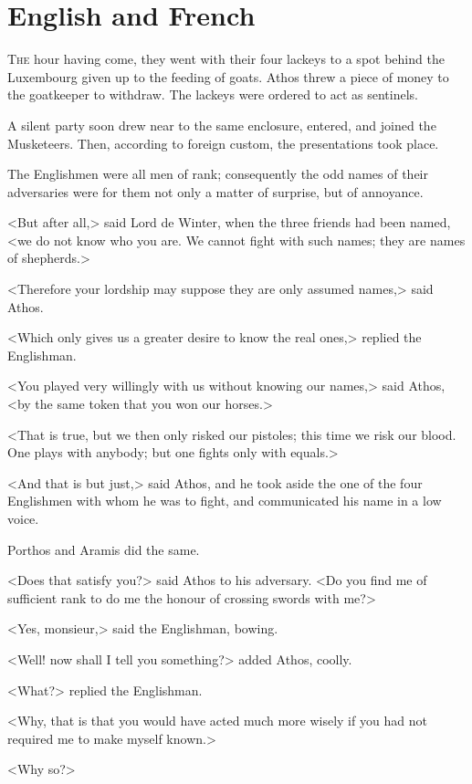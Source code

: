 
\chapter{English and French}

\lettrine{T}{he} hour having come, they went with their four lackeys to a spot behind the Luxembourg given up to the feeding of goats. Athos threw a piece of money to the goatkeeper to withdraw. The lackeys were ordered to act as sentinels. 

\zz
A silent party soon drew near to the same enclosure, entered, and joined the Musketeers. Then, according to foreign custom, the presentations took place. 

The Englishmen were all men of rank; consequently the odd names of their adversaries were for them not only a matter of surprise, but of annoyance. 

<But after all,> said Lord de Winter, when the three friends had been named, <we do not know who you are. We cannot fight with such names; they are names of shepherds.> 

<Therefore your lordship may suppose they are only assumed names,> said Athos. 

<Which only gives us a greater desire to know the real ones,> replied the Englishman. 

<You played very willingly with us without knowing our names,> said Athos, <by the same token that you won our horses.> 

<That is true, but we then only risked our pistoles; this time we risk our blood. One plays with anybody; but one fights only with equals.> 

<And that is but just,> said Athos, and he took aside the one of the four Englishmen with whom he was to fight, and communicated his name in a low voice. 

Porthos and Aramis did the same. 

<Does that satisfy you?> said Athos to his adversary. <Do you find me of sufficient rank to do me the honour of crossing swords with me?> 

<Yes, monsieur,> said the Englishman, bowing. 

<Well! now shall I tell you something?> added Athos, coolly. 

<What?> replied the Englishman. 

<Why, that is that you would have acted much more wisely if you had not required me to make myself known.> 

<Why so?> 


